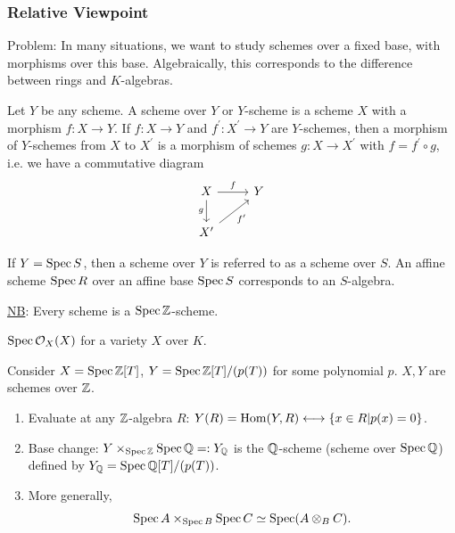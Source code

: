 \documentclass[a4paper,11pt]{article}
\begin{document}
			\subsubsection*{Relative Viewpoint}

				Problem: In many situations, we want to study schemes over a fixed base, with morphisms over this base. Algebraically, this corresponds to the difference between rings and $K$-algebras.

				\begin{defi}
					Let $Y$ be any scheme. A scheme over $Y$ or $Y$-scheme is a scheme $X$ with a morphism $f:X\rightarrow Y$. If $f:X\rightarrow Y$ and $f^\prime:X^\prime\rightarrow Y$ are $Y$-schemes, then a morphism of $Y$-schemes from $X$ to $X^\prime$ is a morphism of schemes $g:X\rightarrow X^\prime$ with $f=f^\prime\circ g$, i.e. we have a commutative diagram
					\begin{equation*}
						\begin{tikzcd}
							X\ar[r,"f"]\ar[d,"g"'] & Y\\
							X^\prime\ar[ru,"f^\prime"'] &
						\end{tikzcd}						
					\end{equation*}
				\end{defi}

				If $Y=\operatorname{Spec} S$, then a scheme over $Y$ is referred to as a scheme over $S$. An affine scheme $\operatorname{Spec} R$ over an affine base $\operatorname{Spec} S$ corresponds to an $S$-algebra.

				\noindent\underline{NB}: Every scheme is a $\operatorname{Spec}\mathbb{Z}$-scheme.

				\begin{eg}
					$\operatorname{Spec} \mathcal{O}_X(X)$ for a variety $X$ over $K$.
				\end{eg}

				\begin{remark}
					Consider $X=\operatorname{Spec}\mathbb{Z}[T]$, $Y=\operatorname{Spec}\mathbb{Z}[T]/(p(T))$ for some polynomial $p$. $X,Y$ are schemes over $\mathbb{Z}$.
					\begin{enumerate}
						\item Evaluate at any $\mathbb{Z}$-algebra $R$: $Y(R)=\operatorname{Hom}(Y,R)\longleftrightarrow\{x\in R|p(x)=0\}$.
						\item Base change: $Y\times_{\operatorname{Spec}\mathbb{Z}}\operatorname{Spec}\mathbb{Q}=:Y_{\mathbb{Q}}$ is the $\mathbb{Q}$-scheme (scheme over $\operatorname{Spec}\mathbb{Q}$) defined by $Y_{\mathbb{Q}}=\operatorname{Spec}\mathbb{Q}[T]/(p(T))$.
						\item More generally,
						\begin{equation*}
							\operatorname{Spec} A\times_{\operatorname{Spec} B}\operatorname{Spec} C\simeq\operatorname{Spec}(A\otimes_BC).
						\end{equation*}
					\end{enumerate}
				\end{remark}
\end{document}
